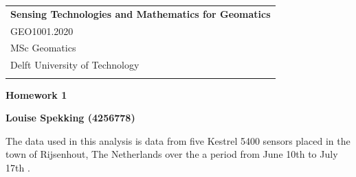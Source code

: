 \documentclass[a4paper,12pt]{article} %
\begin{document}



\thispagestyle{empty} %

\begin{tabular}{p{15.5cm}} %
{\large \bf Sensing Technologies and Mathematics for Geomatics} \\
GEO1001.2020 \\ MSc Geomatics \\ Delft University of Technology \\
\hline %
\\
\end{tabular} %

\vspace*{0.3cm} %

\begin{center} %
	{\Large \bf Homework 1} %
	\vspace{2mm}
	
	{\bf Louise Spekking (4256778)} %
		
\end{center}  

\vspace{0.4cm}


The data used in this analysis is data from five Kestrel 5400 sensors placed in the town of Rijsenhout, The Netherlands over the a period from June 10th to July 17th  \cite{data}.
\end{document}
